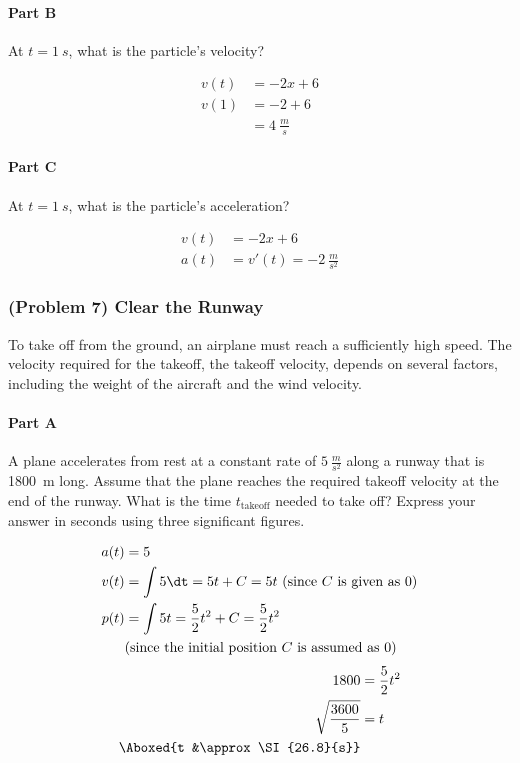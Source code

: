\paragraph{Part B}
At $t=\SI{1}{s}$, what is the particle's velocity?

\begin{solution}
	\begin{align*}
		v(t) &= -2x + 6 \\
		v(1) &= -2 + 6 \\
		&= \boxed{\SI{4}{\frac{m}{s}}}
	\end{align*}
\end{solution}

\paragraph{Part C}
At $t=\SI{1}{s}$, what is the particle's acceleration?

\begin{solution}
	\begin{align*}
		v(t) &= -2x+6 \\
		a(t) &= v'(t) = \boxed{\SI{-2}{\frac{m}{s^2}}}
	\end{align*}
\end{solution}

\newpage

\subsubsection{(Problem 7) Clear the Runway}
To take off from the ground, an airplane must reach a sufficiently high speed. The velocity required for the takeoff, the takeoff velocity, depends on several factors, including the weight of the aircraft and the wind velocity.

\paragraph{Part A}
A plane accelerates from rest at a constant rate of $\SI{5}{\frac{m}{s^2}}$ along a runway that is \SI{1800}{m} long. Assume that the plane reaches the required takeoff velocity at the end of the runway. What is the time $t_{\mathrm{takeoff}}$ needed to take off? Express your answer in seconds using three significant figures.

\begin{solution}
	\begin{align*}
		a(t) &= 5 \\
		v(t) &= \int 5 \dt = 5t + C = 5t ~ \text{(since $C$ is given as 0)} \\
		p(t) &= \int 5t = \frac{5}{2} t^2 + C = \frac{5}{2}t^2 \\
		& \text{(since the initial position $C$ is assumed as 0)}
	\end{align*}
	\begin{align*}
		1800 &= \frac{5}{2}t^2 \\
		\sqrt{\frac{3600}{5}} &= t \\
		\Aboxed{t &\approx \SI{26.8}{s}}
	\end{align*}
\end{solution}

